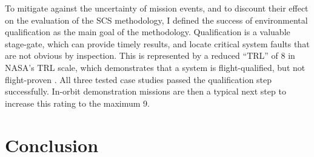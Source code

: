 \documentclass[a4paper,nobib,justified,final]{tufte-book}
\begin{document}
\begin{fullwidth}
\begin{enumerate}
	To mitigate against the uncertainty of mission events, and to discount their effect on the evaluation of the \acs{SCS} methodology, I defined the success of environmental qualification as the main goal of the methodology. Qualification is a valuable stage-gate, which can provide timely results, and locate critical system faults that are not obvious by inspection. This is represented by a reduced ``\acl{TRL}'' of 8 in NASA's \acs{TRL} scale, which demonstrates that a system is flight-qualified, but not flight-proven \cite{sheaNASASystemsEngineering2020}.
	All three tested case studies passed the qualification step successfully.
	In-orbit demonstration missions are then a typical next step to increase this rating to the maximum 9.


\end{enumerate}

\end{fullwidth}

\chapter{Conclusion}
\label{chap:CONCLUSION}
\end{document}

